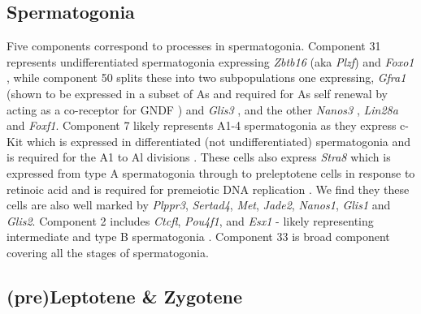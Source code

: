 \subsection{Spermatogonia}


Five components correspond to processes in spermatogonia. Component 31 represents undifferentiated spermatogonia expressing \textit{Zbtb16} (aka \textit{Plzf}) \parencite{Buaas2004Plzf} and \textit{Foxo1} \parencite{Goertz2011Foxo1}, while component 50 splits these into two subpopulations one expressing, \textit{Gfra1} (shown to be expressed in a subset of As and required for As self renewal by acting as a co-receptor for GNDF \parencite{Meng2000Regulation,He2007Gfra1}) and \textit{Glis3} \parencite{Kang2016Transcription}, and the other \textit{Nanos3} \parencite{Suzuki2009heterogeneity}, \textit{Lin28a} \parencite{Zheng2009pluripotency} and \textit{Foxf1}. Component 7 likely represents A1-4 spermatogonia as they express c-Kit which is expressed in differentiated (not undifferentiated) spermatogonia \parencite{Manova1990Gonadal,Schrans-Stassen1999Differential} and is required for the A1 to Al divisions \parencite{Yoshinaga1991Role}. These cells also express \textit{Stra8} which is expressed from type A spermatogonia through to preleptotene cells in response to retinoic acid \parencite{Oulad-Abdelghani1996Characterization,Zhou2008Expressiona,Endo2015Periodic} and is required for premeiotic DNA replication \parencite{Baltus2006germ}. We find they these cells are also well marked by \textit{Plppr3}, \textit{Sertad4}, \textit{Met}, \textit{Jade2}, \textit{Nanos1}, \textit{Glis1} and \textit{Glis2}. Component 2 includes \textit{Ctcfl}, \textit{Pou4f1}, and \textit{Esx1} - likely representing intermediate and type B spermatogonia \parencite{Sleutels2012male, Budhram-Mahadeo2001closely, Maezawa2018Dynamic, Li1997Esx1, Branford1997Spx1}. Component 33 is broad component covering all the stages of spermatogonia.


\subsection{(pre)Leptotene \& Zygotene}

